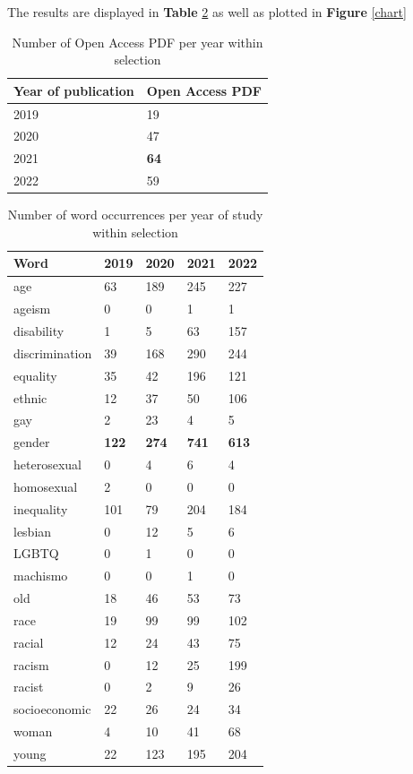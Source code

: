 \documentclass[runningheads]{llncs}
\begin{document}
The results are displayed in \textbf{Table} \ref{tab3} as well as plotted in \textbf{Figure} \ref{chart}
\begin{table}
\caption{Number of Open Access PDF per year within selection}\label{tab2}
\centering
\begin{tabular}{|l|l|}
\hline
Year of publication & Open Access PDF\\
\hline
2019 & 19 \\
2020 & 47 \\
2021 & \textbf{64} \\
2022 & 59 \\
\hline
\end{tabular}
\end{table}

\begin{table}
\caption{Number of word occurrences per year of study within selection}\label{tab3}
\centering
\begin{tabular}{|l|l|l|l|l|}
\hline
Word &  2019 & 2020 & 2021 & 2022\\
\hline
age & 63 & 189 & 245 & 227 \\
ageism & 0 & 0 & 1 & 1 \\
disability & 1 & 5 & 63 & 157 \\
discrimination & 39 & 168 & 290 & 244 \\
equality & 35 & 42 & 196 & 121 \\ 
ethnic & 12 & 37 & 50 & 106 \\
gay & 2 & 23 & 4 & 5 \\
gender &\textbf{122} &\textbf{274} &\textbf{741} &\textbf{613} \\
heterosexual &0 &4 &6 &4 \\
homosexual &2 &0 &0 &0 \\
inequality &101 &79 &204 &184 \\
lesbian &0 &12 &5 &6 \\
LGBTQ &0 &1 &0 &0 \\
machismo &0 &0 &1 &0 \\old &18 &46 &53 &73 \\
race &19 &99 &99 &102 \\
racial &12 &24 &43 &75 \\
racism &0 &12 &25 &199 \\
racist &0 &2 &9 &26 \\
socioeconomic &22 &26 &24 &34 \\
woman &4 &10 &41 &68 \\
young &22 &123 &195 &204 \\
\hline
\end{tabular}
\end{table}
\end{document}
